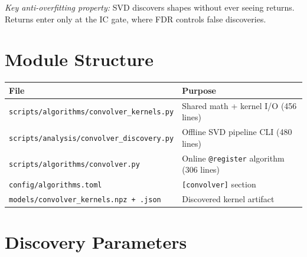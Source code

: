 \documentclass[11pt,a4paper]{article}
\begin{document}
\textit{Key anti-overfitting property:} SVD discovers shapes without
ever seeing returns.  Returns enter only at the IC gate, where FDR controls
false discoveries.

\section{Module Structure}

\begin{center}
\small
\begin{tabular}{lp{9cm}}
\hline
\textbf{File} & \textbf{Purpose} \\
\hline
\texttt{scripts/algorithms/convolver\_kernels.py} & Shared math + kernel I/O (456 lines) \\
\texttt{scripts/analysis/convolver\_discovery.py}  & Offline SVD pipeline CLI (480 lines) \\
\texttt{scripts/algorithms/convolver.py}           & Online \texttt{@register} algorithm (306 lines) \\
\texttt{config/algorithms.toml}                    & \texttt{[convolver]} section \\
\texttt{models/convolver\_kernels.npz + .json}     & Discovered kernel artifact \\
\hline
\end{tabular}
\end{center}

\section{Discovery Parameters}
\end{document}
